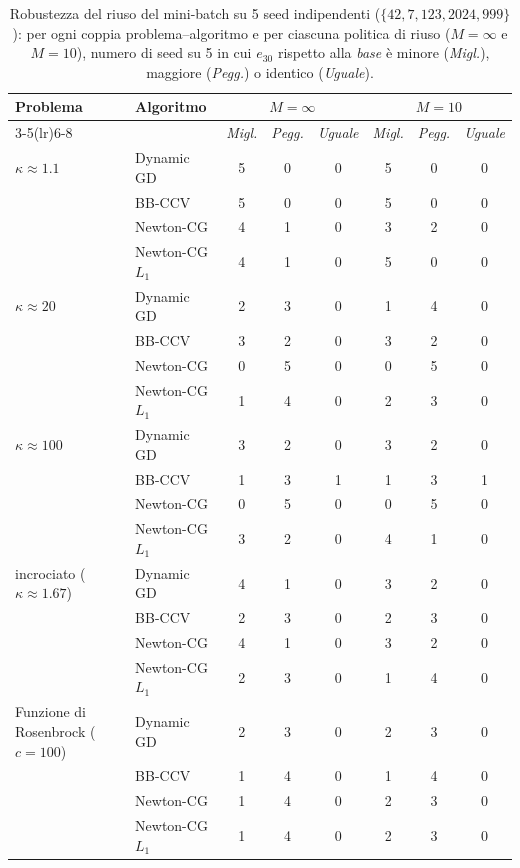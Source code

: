 \documentclass[a4paper,12pt]{article}
\numberwithin{equation}{section}
\numberwithin{figure}{section}
\numberwithin{table}{section}
\begin{document}



\begin{table}[H]
\centering
\footnotesize
\renewcommand{\arraystretch}{1.0}
\setlength{\tabcolsep}{2pt}
\caption{Robustezza del riuso del mini-batch su 5 seed indipendenti ($\{42,7,123,2024,999\}$): per ogni coppia problema--algoritmo e per ciascuna politica di riuso ($M{=}\infty$ e $M{=}10$), numero di seed su 5 in cui $e_{30}$ rispetto alla \emph{base} è minore (\emph{Migl.}), maggiore (\emph{Pegg.}) o identico (\emph{Uguale}).}
\label{tab:riuso_robustezza}
\begin{tabular}{@{}llccc|ccc@{}}
\toprule
Problema & Algoritmo & \multicolumn{3}{c}{$M{=}\infty$} & \multicolumn{3}{c}{$M{=}10$}\\
\cmidrule(lr){3-5}\cmidrule(lr){6-8}
 & & \emph{Migl.} & \emph{Pegg.} & \emph{Uguale} & \emph{Migl.} & \emph{Pegg.} & \emph{Uguale}\\
\midrule
$\kappa\approx1.1$ & Dynamic GD & 5 & 0 & 0 & 5 & 0 & 0\\
 & BB-CCV & 5 & 0 & 0 & 5 & 0 & 0\\
 & Newton-CG & 4 & 1 & 0 & 3 & 2 & 0\\
 & Newton-CG $L_1$ & 4 & 1 & 0 & 5 & 0 & 0\\
\midrule
$\kappa\approx20$ & Dynamic GD & 2 & 3 & 0 & 1 & 4 & 0\\
 & BB-CCV & 3 & 2 & 0 & 3 & 2 & 0\\
 & Newton-CG & 0 & 5 & 0 & 0 & 5 & 0\\
 & Newton-CG $L_1$ & 1 & 4 & 0 & 2 & 3 & 0\\
\midrule
$\kappa\approx100$ & Dynamic GD & 3 & 2 & 0 & 3 & 2 & 0\\
 & BB-CCV & 1 & 3 & 1 & 1 & 3 & 1\\
 & Newton-CG & 0 & 5 & 0 & 0 & 5 & 0\\
 & Newton-CG $L_1$ & 3 & 2 & 0 & 4 & 1 & 0\\
\midrule
incrociato ($\kappa\approx1.67$) & Dynamic GD & 4 & 1 & 0 & 3 & 2 & 0\\
 & BB-CCV & 2 & 3 & 0 & 2 & 3 & 0\\
 & Newton-CG & 4 & 1 & 0 & 3 & 2 & 0\\
 & Newton-CG $L_1$ & 2 & 3 & 0 & 1 & 4 & 0\\
\midrule
Funzione di Rosenbrock ($c{=}100$) & Dynamic GD & 2 & 3 & 0 & 2 & 3 & 0\\
 & BB-CCV & 1 & 4 & 0 & 1 & 4 & 0\\
 & Newton-CG & 1 & 4 & 0 & 2 & 3 & 0\\
 & Newton-CG $L_1$ & 1 & 4 & 0 & 2 & 3 & 0\\
\bottomrule
\end{tabular}
\end{table}
\end{document}
